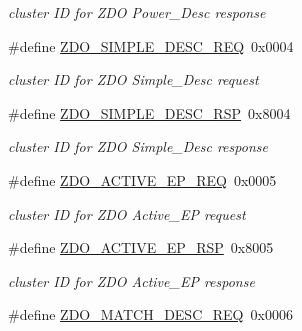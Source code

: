 \begin{DoxyCompactItemize}
\begin{DoxyCompactList}\small\item\em cluster I\-D for Z\-D\-O Power\-\_\-\-Desc response \end{DoxyCompactList}\item 
\hypertarget{group__zdo_ga273177b195b871fe08bb7e5cab487141}{\#define \hyperlink{group__zdo_ga273177b195b871fe08bb7e5cab487141}{Z\-D\-O\-\_\-\-S\-I\-M\-P\-L\-E\-\_\-\-D\-E\-S\-C\-\_\-\-R\-E\-Q}~0x0004}\label{group__zdo_ga273177b195b871fe08bb7e5cab487141}

\begin{DoxyCompactList}\small\item\em cluster I\-D for Z\-D\-O Simple\-\_\-\-Desc request \end{DoxyCompactList}\item 
\hypertarget{group__zdo_gac3b06d8201953a14e1e7d38d5d812de8}{\#define \hyperlink{group__zdo_gac3b06d8201953a14e1e7d38d5d812de8}{Z\-D\-O\-\_\-\-S\-I\-M\-P\-L\-E\-\_\-\-D\-E\-S\-C\-\_\-\-R\-S\-P}~0x8004}\label{group__zdo_gac3b06d8201953a14e1e7d38d5d812de8}

\begin{DoxyCompactList}\small\item\em cluster I\-D for Z\-D\-O Simple\-\_\-\-Desc response \end{DoxyCompactList}\item 
\hypertarget{group__zdo_gaece69bc80056a9892623eadf1ce84d8d}{\#define \hyperlink{group__zdo_gaece69bc80056a9892623eadf1ce84d8d}{Z\-D\-O\-\_\-\-A\-C\-T\-I\-V\-E\-\_\-\-E\-P\-\_\-\-R\-E\-Q}~0x0005}\label{group__zdo_gaece69bc80056a9892623eadf1ce84d8d}

\begin{DoxyCompactList}\small\item\em cluster I\-D for Z\-D\-O Active\-\_\-\-E\-P request \end{DoxyCompactList}\item 
\hypertarget{group__zdo_ga8b3c50e3be71969eacf69d4197acd2b0}{\#define \hyperlink{group__zdo_ga8b3c50e3be71969eacf69d4197acd2b0}{Z\-D\-O\-\_\-\-A\-C\-T\-I\-V\-E\-\_\-\-E\-P\-\_\-\-R\-S\-P}~0x8005}\label{group__zdo_ga8b3c50e3be71969eacf69d4197acd2b0}

\begin{DoxyCompactList}\small\item\em cluster I\-D for Z\-D\-O Active\-\_\-\-E\-P response \end{DoxyCompactList}\item 
\hypertarget{group__zdo_ga8c614773175b0518e3a1f5a512dfe4d1}{\#define \hyperlink{group__zdo_ga8c614773175b0518e3a1f5a512dfe4d1}{Z\-D\-O\-\_\-\-M\-A\-T\-C\-H\-\_\-\-D\-E\-S\-C\-\_\-\-R\-E\-Q}~0x0006}\label{group__zdo_ga8c614773175b0518e3a1f5a512dfe4d1}


\end{DoxyCompactItemize}
